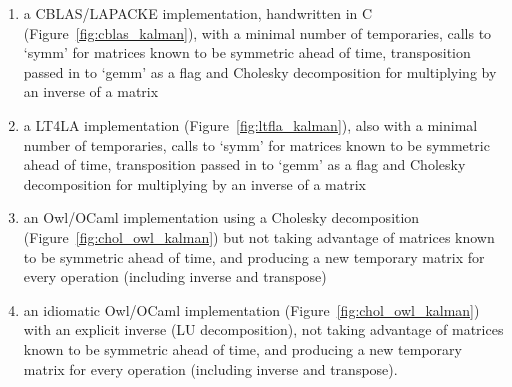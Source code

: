 \begin{enumerate}

    \item a CBLAS/LAPACKE implementation, handwritten in C
        (Figure~\ref{fig:cblas_kalman}), with a minimal number of temporaries,
        calls to `symm' for matrices known to be symmetric ahead of time,
        transposition passed in to `gemm' as a flag and Cholesky decomposition
        for multiplying by an inverse of a matrix

    \item a LT4LA implementation (Figure~\ref{fig:ltfla_kalman}), also with a
        minimal number of temporaries, calls to `symm' for matrices known to be
        symmetric ahead of time, transposition passed in to `gemm' as a flag
        and Cholesky decomposition for multiplying by an inverse of a matrix

    \item an Owl/OCaml implementation using a Cholesky decomposition
        (Figure~\ref{fig:chol_owl_kalman}) but not taking advantage of matrices
        known to be symmetric ahead of time, and producing a new temporary
        matrix for every operation (including inverse and transpose)

    \item an idiomatic Owl/OCaml implementation
        (Figure~\ref{fig:chol_owl_kalman}) with an explicit inverse (LU
        decomposition), not taking advantage of matrices known to be symmetric
        ahead of time, and producing a new temporary matrix for every operation
        (including inverse and transpose).

\end{enumerate}

